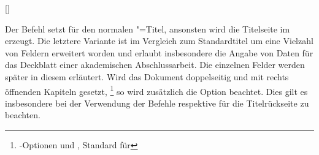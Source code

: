 \begin{Declaration*}{}
\begin{Declaration*}{}
\begin{Declaration*}{}
\begin{Declaration}{[]}
\begin{Declaration}[v2.02]{%
}
\begin{Declaration}[v2.02]{}{%
}
\begin{Declaration}[v2.03]{}{%
}
\begin{Declaration}[v2.03]{}{%
}
\begin{Declaration}[v2.03]{%
}{}
\begin{Declaration}[v2.03]{%
}{}
\begin{Declaration}[v2.03]{}{%
}
\begin{Declaration}[v2.03]{}{%
}
\begin{Declaration}[v2.03]{}{%
}
\printdeclarationlist%
%
%
%
Der Befehl  setzt für  den normalen 
\KOMAScript"=Titel{}, ansonsten wird die Titelseite im \TUDCD erzeugt. Die 
letztere Variante ist im Vergleich zum Standardtitel um eine Vielzahl von 
Feldern erweitert worden und erlaubt insbesondere die Angabe von Daten für das 
Deckblatt einer akademischen Abschlussarbeit. Die einzelnen Felder werden 
später in diesem \autorefname erläutert. Wird das Dokument doppelseitig und mit 
rechts öffnenden Kapiteln gesetzt,%
\footnote{%
  \KOMAScript-Optionen  und , Standard 
  für 
}
so wird zusätzlich die Option  beachtet. Dies gilt es 
insbesondere bei der Verwendung der Befehle  respektive 
 für die Titelrückseite zu beachten.


\end{Declaration}
\end{Declaration}
\end{Declaration}
\end{Declaration}
\end{Declaration}
\end{Declaration}
\end{Declaration}
\end{Declaration}
\end{Declaration}
\end{Declaration}
\end{Declaration*}
\end{Declaration*}
\end{Declaration*}
